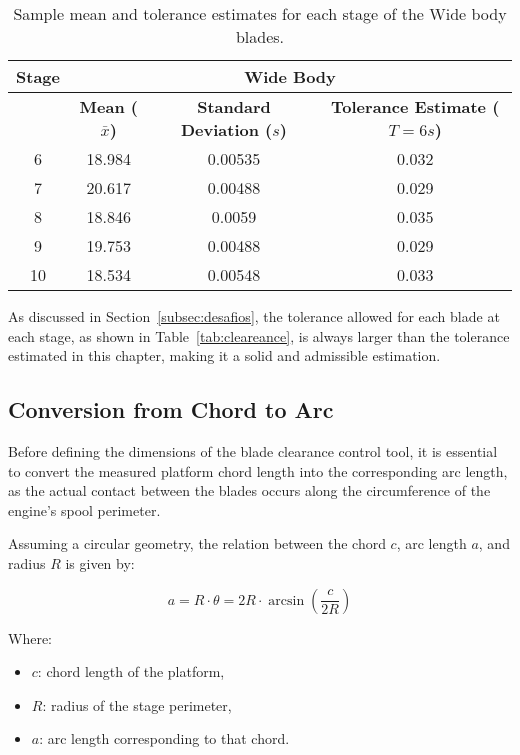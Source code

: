 \begin{table}[H]
    \centering
    \caption{Sample mean and tolerance estimates for each stage of the Wide body blades.}
    \label{tab:mean_tolerance_wide}
    \begin{tabular}{cccc}
        \hline
        \textbf{Stage} & \multicolumn{3}{c|}{\textbf{Wide Body}} \\
        \hline
        & \textbf{Mean (\( \bar{x} \))} & \textbf{Standard Deviation (\( s \))} & \textbf{Tolerance Estimate (\( T = 6s \))} \\
        \hline
        6  & 18.984 & 0.00535 & 0.032 \\
        7  & 20.617 & 0.00488 & 0.029 \\
        8  & 18.846 & 0.0059  & 0.035 \\
        9  & 19.753 & 0.00488  & 0.029 \\
        10 & 18.534 & 0.00548  & 0.033 \\
        \hline
    \end{tabular}
\end{table}

As discussed in Section~\ref{subsec:desafios}, the tolerance allowed for each blade at each stage, as shown in Table~\ref{tab:cleareance}, is always larger than the tolerance estimated in this chapter, making it a solid and admissible estimation.

\subsection{Conversion from Chord to Arc}

Before defining the dimensions of the blade clearance control tool, it is essential to convert the measured platform chord length into the corresponding arc length, as the actual contact between the blades occurs along the circumference of the engine's spool perimeter.

Assuming a circular geometry, the relation between the chord \(c\), arc length \(a\), and radius \(R\) is given by:

\[
a = R \cdot \theta = 2R \cdot \arcsin\left( \frac{c}{2R} \right)
\]

Where:
\begin{itemize}
    \item \(c\): chord length of the platform,
    \item \(R\): radius of the stage perimeter,
    \item \(a\): arc length corresponding to that chord.
\end{itemize}

